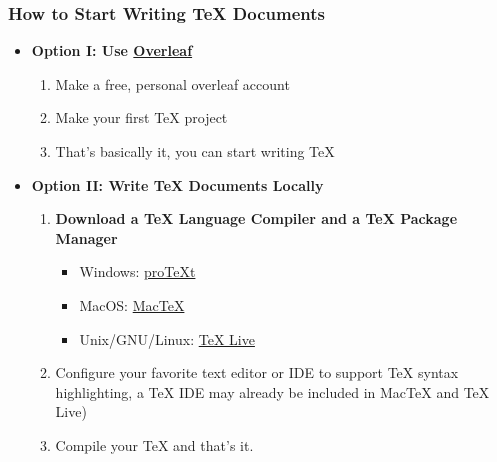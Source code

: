 \documentclass{beamer}
\begin{document}
\begin{frame}
  \frametitle{How to Start Writing {\TeX} Documents}
  \begin{itemize}
    \item \textbf{Option I: Use \href{overleaf.com}{Overleaf}}
      \begin{enumerate}
        \item Make a free, personal overleaf account
        \item Make your first {\TeX} project
        \item That's basically it, you can start writing {\TeX}
      \end{enumerate}
    \item \textbf{Option II: Write {\TeX} Documents Locally}
      \begin{enumerate}
        \item \textbf{Download a {\TeX} Language Compiler and a TeX Package Manager}
          \begin{itemize}
            \item Windows:
              \href{http://ctan.math.illinois.edu/systems/windows/protext/}{proTeXt}
            \item MacOS:
              \href{https://www.tug.org/mactex/mactex-download.html}{MacTeX}
            \item Unix/GNU/Linux:
              \href{https://tug.org/texlive/acquire-netinstall.html}{TeX Live}
          \end{itemize}
        \item Configure your favorite text editor or IDE to support {\TeX}
          syntax highlighting, a {\TeX} IDE may already be included in MacTeX and TeX
          Live)
        \item Compile your {\TeX} and that's it.
      \end{enumerate}
  \end{itemize}
\end{frame}
\end{document}
